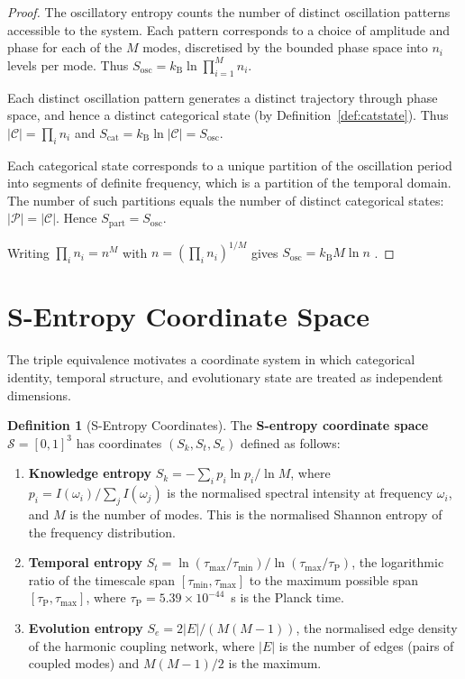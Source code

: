 \documentclass[11pt,a4paper]{article}
\theoremstyle{definition}
\newtheorem{definition}[theorem]{Definition}
\theoremstyle{remark}
\newcommand{\kB}{k_{\mathrm{B}}}
\newcommand{\Partition}{\mathcal{P}}
\newcommand{\Cat}{\mathcal{C}}
\newcommand{\Sk}{S_k}
\newcommand{\St}{S_t}
\newcommand{\Se}{S_e}
\newcommand{\Sspace}{\mathcal{S}}
\begin{document}
\begin{proof}
The oscillatory entropy counts the number of distinct oscillation patterns accessible to the system. Each pattern corresponds to a choice of amplitude and phase for each of the $M$ modes, discretised by the bounded phase space into $n_i$ levels per mode. Thus $S_{\mathrm{osc}} = \kB \ln \prod_{i=1}^M n_i$.

Each distinct oscillation pattern generates a distinct trajectory through phase space, and hence a distinct categorical state (by Definition~\ref{def:catstate}). Thus $|\Cat| = \prod_i n_i$ and $S_{\mathrm{cat}} = \kB \ln |\Cat| = S_{\mathrm{osc}}$.

Each categorical state corresponds to a unique partition of the oscillation period into segments of definite frequency, which is a partition of the temporal domain. The number of such partitions equals the number of distinct categorical states: $|\Partition| = |\Cat|$. Hence $S_{\mathrm{part}} = S_{\mathrm{osc}}$.

Writing $\prod_i n_i = n^M$ with $n = (\prod_i n_i)^{1/M}$ gives $S_{\mathrm{osc}} = \kB M \ln n$ \citep{boltzmann1877}.
\end{proof}

\section{S-Entropy Coordinate Space}
\label{sec:sentropy}

The triple equivalence motivates a coordinate system in which categorical identity, temporal structure, and evolutionary state are treated as independent dimensions.

\begin{definition}[S-Entropy Coordinates]
\label{def:sentropy}
The \textbf{S-entropy coordinate space} $\Sspace = [0,1]^3$ has coordinates $(\Sk, \St, \Se)$ defined as follows:
\begin{enumerate}[label=(\alph*)]
  \item \textbf{Knowledge entropy} $\Sk = -\sum_i p_i \ln p_i / \ln M$, where $p_i = I(\omega_i) / \sum_j I(\omega_j)$ is the normalised spectral intensity at frequency $\omega_i$, and $M$ is the number of modes. This is the normalised Shannon entropy \citep{shannon1948} of the frequency distribution.
  \item \textbf{Temporal entropy} $\St = \ln(\tau_{\max}/\tau_{\min}) / \ln(\tau_{\max}/\tau_{\mathrm{P}})$, the logarithmic ratio of the timescale span $[\tau_{\min}, \tau_{\max}]$ to the maximum possible span $[\tau_{\mathrm{P}}, \tau_{\max}]$, where $\tau_{\mathrm{P}} = 5.39 \times 10^{-44}$~s is the Planck time.
  \item \textbf{Evolution entropy} $\Se = 2|E| / (M(M-1))$, the normalised edge density of the harmonic coupling network, where $|E|$ is the number of edges (pairs of coupled modes) and $M(M-1)/2$ is the maximum.
\end{enumerate}
\end{definition}
\end{document}
